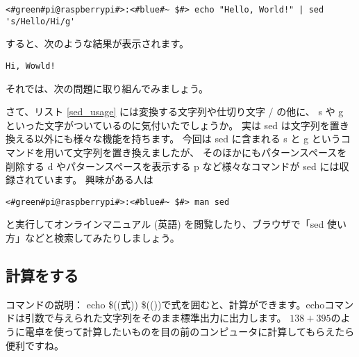 \begin{lstlisting}[caption=sed コマンドを使った例, label=sed_app]
<#green#pi@raspberrypi#>:<#blue#~ $#> echo "Hello, World!" | sed 's/Hello/Hi/g'
\end{lstlisting}

すると、次のような結果が表示されます。

\begin{lstlisting}[caption=sed コマンドで変換した結果, label=sed_result]
Hi, Wowld!
\end{lstlisting}

それでは、次の問題に取り組んでみましょう。

\begin{tcolorbox}[title=\useOmetoi]
\begin{enumerate}
\end{enumerate}
\end{tcolorbox}

さて、リスト \ref{sed_usage} には変換する文字列や仕切り文字 / の他に、
s や g といった文字がついているのに気付いたでしょうか。
実は sed は文字列を置き換える以外にも様々な機能を持ちます。
今回は sed に含まれる s と g というコマンドを用いて文字列を置き換えましたが、
そのほかにもパターンスペースを削除する d やパターンスペースを表示する p など様々なコマンドが sed には収録されています。
興味がある人は

\begin{lstlisting}
<#green#pi@raspberrypi#>:<#blue#~ $#> man sed
\end{lstlisting}

と実行してオンラインマニュアル (英語) を閲覧したり、ブラウザで「sed 使い方」などと検索してみたりしましょう。

\subsection{計算をする}

コマンドの説明： echo \$((式))
\$(())で式を囲むと、計算ができます。echoコマンドは引数で与えられた文字列をそのまま標準出力に出力します。
$138 + 395$のように電卓を使って計算したいものを目の前のコンピュータに計算してもらえたら便利ですね。

